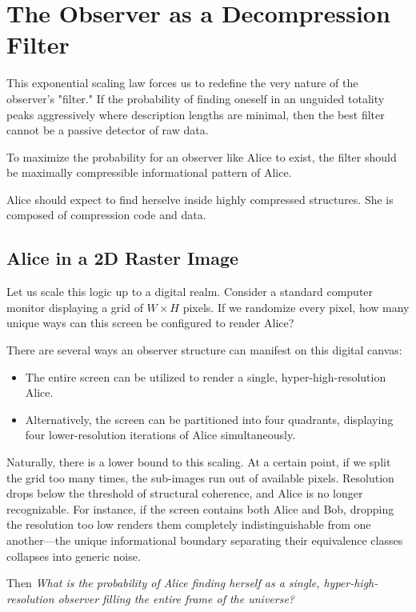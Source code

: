 \section{The Observer as a Decompression Filter}

This exponential scaling law forces us to redefine the very nature of the observer's "filter."
If the probability of finding oneself in an unguided totality peaks aggressively where description lengths are minimal, then the best filter cannot be a passive detector of raw data. 

To maximize the probability for an observer like Alice to exist, the filter should be maximally compressible informational
pattern of Alice.

Alice should expect to find herselve inside highly compressed structures. She is composed of compression code and data.



\subsection{Alice in a 2D Raster Image}

Let us scale this logic up to a digital realm.
Consider a standard computer monitor displaying a grid of $W \times H$ pixels.
If we randomize every pixel, how many unique ways can this screen be configured to render Alice?

There are several ways an observer structure can manifest on this digital canvas:
\begin{itemize}
    \item The entire screen can be utilized to render a single, hyper-high-resolution Alice.
    \item Alternatively, the screen can be partitioned into four quadrants, displaying four lower-resolution iterations of Alice simultaneously.
\end{itemize}

Naturally, there is a lower bound to this scaling.
At a certain point, if we split the grid too many times, the sub-images run out of available pixels.
Resolution drops below the threshold of structural coherence, and Alice is no longer recognizable.
For instance, if the screen contains both Alice and Bob, dropping the resolution too low renders them completely indistinguishable from one another—the unique informational 
boundary separating their equivalence classes collapses into generic noise.

Then \emph{What is the probability of Alice finding herself as a single, hyper-high-resolution observer filling the entire frame of the universe?}

